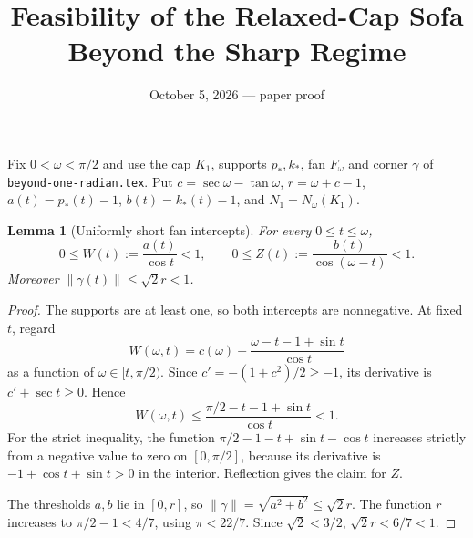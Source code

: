 \documentclass[11pt]{article}
\title{Feasibility of the Relaxed-Cap Sofa Beyond the Sharp Regime}
\author{}\date{October 5, 2026 --- paper proof}
\newtheorem{lemma}{Lemma}
\begin{document}
\maketitle
Fix $0<\omega<\pi/2$ and use the cap $K_1$, supports $p_*,k_*$, fan $F_\omega$ and corner $\gamma$ of \texttt{beyond-one-radian.tex}. Put $c=\sec\omega-\tan\omega$, $r=\omega+c-1$, $a(t)=p_*(t)-1$, $b(t)=k_*(t)-1$, and $N_1=N_\omega(K_1)$.

\begin{lemma}[Uniformly short fan intercepts]
For every $0\le t\le\omega$,
\[
 0\le W(t):=\frac{a(t)}{\cos t}<1,\qquad
 0\le Z(t):=\frac{b(t)}{\cos(\omega-t)}<1.
\]
Moreover $\|\gamma(t)\|\le\sqrt2 r<1$.
\end{lemma}
\begin{proof}
The supports are at least one, so both intercepts are nonnegative. At fixed $t$, regard
\[
 W(\omega,t)=c(\omega)+\frac{\omega-t-1+\sin t}{\cos t}
\]
as a function of $\omega\in[t,\pi/2)$. Since $c'=-(1+c^2)/2\ge-1$, its derivative is $c'+\sec t\ge0$. Hence
\[
 W(\omega,t)\le\frac{\pi/2-t-1+\sin t}{\cos t}<1.
\]
For the strict inequality, the function $\pi/2-1-t+\sin t-\cos t$ increases strictly from a negative value to zero on $[0,\pi/2]$, because its derivative is $-1+\cos t+\sin t>0$ in the interior. Reflection gives the claim for $Z$.

The thresholds $a,b$ lie in $[0,r]$, so $\|\gamma\|=\sqrt{a^2+b^2}\le\sqrt2 r$. The function $r$ increases to $\pi/2-1<4/7$, using $\pi<22/7$. Since $\sqrt2<3/2$, $\sqrt2r<6/7<1$.
\end{proof}
\end{document}
